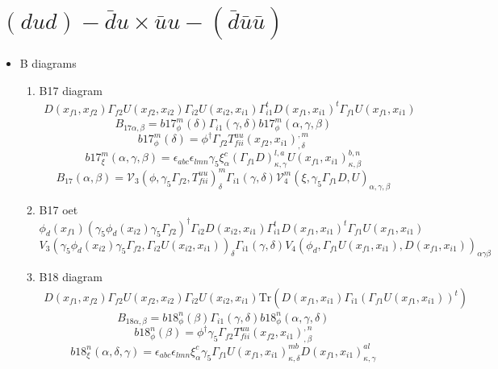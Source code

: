 \documentclass{article}[12pt]
\begin{document}
\section{$(dud)-\bar{d}u \times \bar{u}u-(\bar{d}\bar{u}\bar{u}) $}
\begin{itemize}
\item B diagrams
\begin{enumerate}
\item B17 diagram
\begin{eqnarray}
D(x_{f1},x_{f2})\Gamma_{f2}U(x_{f2},x_{i2})\Gamma_{i2}U(x_{i2},x_{i1})\Gamma_{i1}^tD(x_{f1},x_{i1})^t\Gamma_{f1}U(x_{f1},x_{i1}) 
\end{eqnarray}
$$
B_{17\alpha,\beta}=b17_{\phi}^{m}\left(\delta\right)\Gamma_{i1}\left(\gamma,\delta\right)b17_{\phi}^{m}\left(\alpha,\gamma,\beta\right)
$$
$$
b17_{\phi}^{m}\left(\delta\right)=\phi^{\dagger}\Gamma_{f2}T_{fii}^{uu}\left(x_{f2},x_{i1}\right)^{,m}_{,\delta}
$$
$$
b17_{\xi}^{m}\left(\alpha,\gamma,\beta\right)=\epsilon_{abc}\epsilon_{lmn}\gamma_5\xi^{c}_{\alpha}\left(\Gamma_{f1}D\right)_{\kappa,\gamma}^{l,a}U\left(x_{f1},x_{i1}\right)_{\kappa,\beta}^{b,n}
$$
$$
B_{17}\left(\alpha,\beta\right)={\mathcal V}_{3}\left(\phi,\gamma_5\Gamma_{f2},T_{fii}^{uu}\right)^{m}_{\delta}\Gamma_{i1}\left(\gamma,\delta\right){\mathcal V}_{4}^m\left(\xi,\gamma_5\Gamma_{f1}D,U\right)_{\alpha,\gamma,\beta}
$$
\item B17 oet
$$
\phi_d(x_{f1})(\gamma_5\phi_d(x_{i2})\gamma_5\Gamma_{f2})^{\dagger}\Gamma_{i2}D(x_{i2},x_{i1})\Gamma_{i1}^tD(x_{f1},x_{i1})^t\Gamma_{f1}U(x_{f1},x_{i1})
$$
$$
V_3(\gamma_5\phi_d(x_{i2})\gamma_5\Gamma_{f2},\Gamma_{i2}U(x_{i2},x_{i1}))_{\delta}\Gamma_{i1}(\gamma,\delta)V_4(\phi_d,\Gamma_{f1}U(x_{f1},x_{i1}),D(x_{f1},x_{i1}))_{\alpha\gamma\beta}
$$
\item B18 diagram
\begin{eqnarray}
D(x_{f1},x_{f2})\Gamma_{f2}U(x_{f2},x_{i2})\Gamma_{i2}U(x_{i2},x_{i1})\mathrm{Tr}(D(x_{f1},x_{i1})\Gamma_{i1}\left(\Gamma_{f1}U(x_{f1},x_{i1})\right)^t)
\end{eqnarray}
$$
B_{18\alpha,\beta}=b18_{\phi}^{n}\left(\beta\right)\Gamma_{i1}\left(\gamma,\delta\right)b18_{\phi}^{n}\left(\alpha,\gamma,\delta\right)
$$
$$
b18_{\phi}^{n}\left(\beta\right)=\phi^{\dagger}\gamma_5\Gamma_{f2}T_{fii}^{uu}\left(x_{f2},x_{i1}\right)^{,n}_{,\beta}
$$
$$
b18_{\xi}^{n}\left(\alpha,\delta,\gamma\right)=\epsilon_{abc}\epsilon_{lmn}\xi^{c}_\alpha \gamma_5\Gamma_{f1}U\left(x_{f1},x_{i1}\right)^{mb}_{\kappa,\delta}D\left(x_{f1},x_{i1}\right)^{al}_{\kappa,\gamma}
$$

\end{enumerate}
\end{itemize}
\end{document}
